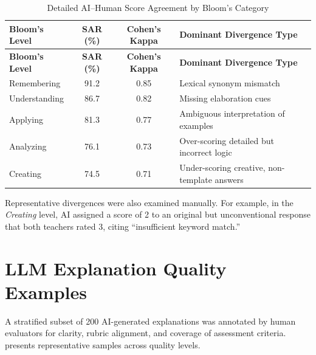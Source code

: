 {
\setlength{\LTleft}{-0.5cm}
\setlength{\LTright}{0pt}
\centering
\begin{longtable}{l c c l}
    \caption{Detailed AI–Human Score Agreement by Bloom’s Category}
    \label{tab:ai_human_comparison_app}
    \\

    \hline
    \textbf{Bloom’s Level} & \textbf{SAR (\%)} & \textbf{Cohen's Kappa} & \textbf{Dominant Divergence Type} \\
    \hline
    \endfirsthead

    \hline
    \textbf{Bloom’s Level} & \textbf{SAR (\%)} & \textbf{Cohen's Kappa} & \textbf{Dominant Divergence Type} \\
    \hline
    \endhead

    \hline
    \endfoot

    Remembering & 91.2 & 0.85 & Lexical synonym mismatch \\
    Understanding & 86.7 & 0.82 & Missing elaboration cues \\
    Applying & 81.3 & 0.77 & Ambiguous interpretation of examples \\
    Analyzing & 76.1 & 0.73 & Over-scoring detailed but incorrect logic \\
    Creating & 74.5 & 0.71 & Under-scoring creative, non-template answers \\
        
\end{longtable}
}

Representative divergences were also examined manually. 
For example, in the \textit{Creating} level, AI assigned a 
score of 2 to an original but unconventional response that 
both teachers rated 3, citing “insufficient keyword match.”


\section{LLM Explanation Quality Examples}

A stratified subset of 200 AI-generated explanations was 
annotated by human evaluators for clarity, rubric alignment, 
and coverage of assessment criteria. 
 presents representative 
samples across quality levels.

